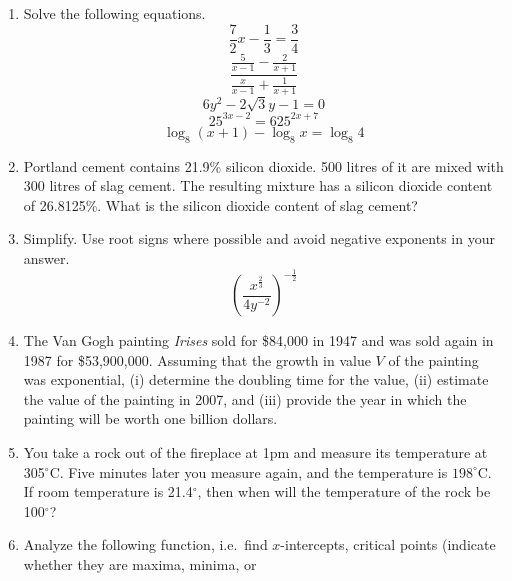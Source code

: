 \documentclass[11pt]{article}
\begin{document}
\begin{enumerate}
\item Solve the following equations.
  \begin{equation}
    \label{eq:thephohk}
    \frac{7}{2}x-\frac{1}{3}=\frac{3}{4}
  \end{equation}
  \begin{equation}
    \label{eq:uchoowai}
    \frac{\frac{5}{x-1}-\frac{2}{x+1}}{\frac{x}{x-1}+\frac{1}{x+1}}
  \end{equation}
  \begin{equation}
    \label{eq:eishahji}
    6y^{2}-2\sqrt{3}y-1=0
  \end{equation}
  \begin{equation}
    \label{eq:vohtovuj}
    25^{3x-2}=625^{2x+7}
  \end{equation}
  \begin{equation}
    \label{eq:laishedu}
    \log_{8}(x+1)-\log_{8}x=\log_{8}4
  \end{equation}
\item Portland cement contains 21.9\% silicon dioxide. 500 litres of
  it are mixed with 300 litres of slag cement. The resulting mixture
  has a silicon dioxide content of 26.8125\%. What is the silicon
  dioxide content of slag cement?
\item Simplify. Use root signs where possible and avoid negative
  exponents in your answer.
  \begin{equation}
    \label{eq:einicohx}
    \left(\frac{x^{\frac{2}{3}}}{4y^{-2}}\right)^{-\frac{1}{2}}
  \end{equation}
\item The Van Gogh painting \emph{Irises} sold for \$84,000 in 1947
  and was sold again in 1987 for \$53,900,000. Assuming that the
  growth in value $V$ of the painting was exponential, (i) determine the
  doubling time for the value, (ii) estimate the value of the painting
  in 2007, and (iii) provide the year in which the painting will be worth
  one billion dollars.
\item You take a rock out of the fireplace at 1pm and measure its
  temperature at 305$^{\circ}$C. Five minutes later you measure again,
  and the temperature is $198^{\circ}$C. If room temperature is
  21.4$^{\circ}$, then when will the temperature of the rock be
  100$^{\circ}$?
\item Analyze the following function, i.e.\ find $x$-intercepts,
  critical points (indicate whether they are maxima, minima, or

\end{enumerate}
\end{document}
